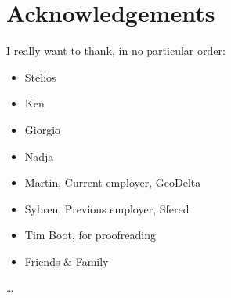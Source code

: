 
\chapter*{Acknowledgements}
I really want to thank, in no particular order:
\begin{itemize}
    \item Stelios
    \item Ken
    \item Giorgio
    \item Nadja
    \item Martin, Current employer, GeoDelta 
    \item Sybren, Previous employer, Sfered
    \item Tim Boot, for proofreading
    \item Friends \& Family
\end{itemize}

\ldots



 
